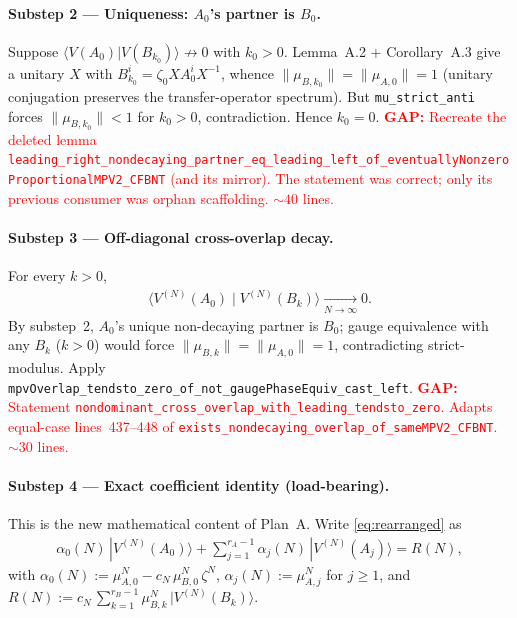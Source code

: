 \documentclass{article}
\newcommand{\leanid}[1]{\texttt{#1}}
\newcommand{\gap}[1]{\textcolor{red}{\textbf{GAP:} #1}}
\theoremstyle{plain}
\begin{document}
\paragraph{Substep 2 --- Uniqueness: $A_0$'s partner is $B_0$.}
Suppose $\langle V(A_0)|V(B_{k_0})\rangle \not\to 0$ with $k_0 > 0$.
Lemma~A.2 + Corollary~A.3 give a unitary $X$ with $B_{k_0}^i = \zeta_0
    X A_0^i X^{-1}$, whence $\|\mu_{B,k_0}\| = \|\mu_{A,0}\| = 1$ (unitary
conjugation preserves the transfer-operator spectrum). But
\leanid{mu\_strict\_anti} forces $\|\mu_{B,k_0}\| < 1$ for $k_0 > 0$,
contradiction. Hence $k_0 = 0$.
\gap{Recreate the deleted lemma
    \leanid{leading\_right\_nondecaying\_partner\_eq\_leading\_left\_of\_eventuallyNonzeroProportionalMPV2\_CFBNT}
    (and its mirror). The statement was correct; only its previous consumer
    was orphan scaffolding. $\sim 40$ lines.}

\paragraph{Substep 3 --- Off-diagonal cross-overlap decay.}
For every $k > 0$,
\begin{align}
    \langle V^{(N)}(A_0)\mid V^{(N)}(B_k)\rangle
    \xrightarrow[N\to\infty]{} 0.
    \label{eq:A0-Bk-decay}
\end{align}
By substep~2, $A_0$'s unique non-decaying partner is $B_0$; gauge
equivalence with any $B_k$ ($k > 0$) would force $\|\mu_{B,k}\| =
    \|\mu_{A,0}\| = 1$, contradicting strict-modulus. Apply
\leanid{mpvOverlap\_tendsto\_zero\_of\_not\_gaugePhaseEquiv\_cast\_left}.
\gap{Statement
    \leanid{nondominant\_cross\_overlap\_with\_leading\_tendsto\_zero}.
    Adapts equal-case lines~437--448 of
    \leanid{exists\_nondecaying\_overlap\_of\_sameMPV2\_CFBNT}. $\sim 30$
    lines.}

\paragraph{Substep 4 --- Exact coefficient identity (load-bearing).}
This is the new mathematical content of Plan~A. Write
\eqref{eq:rearranged} as
\begin{align}
    \alpha_0(N)\,|V^{(N)}(A_0)\rangle + \sum_{j=1}^{r_A-1} \alpha_j(N)\,|V^{(N)}(A_j)\rangle = R(N),
    \label{eq:bnt-A-side}
\end{align}
with
$\alpha_0(N) := \mu_{A,0}^N - c_N\,\mu_{B,0}^N\,\zeta^N$,
$\alpha_j(N) := \mu_{A,j}^N$ for $j \ge 1$, and
$R(N) := c_N\,\sum_{k=1}^{r_B-1} \mu_{B,k}^N\,|V^{(N)}(B_k)\rangle$.
\end{document}
